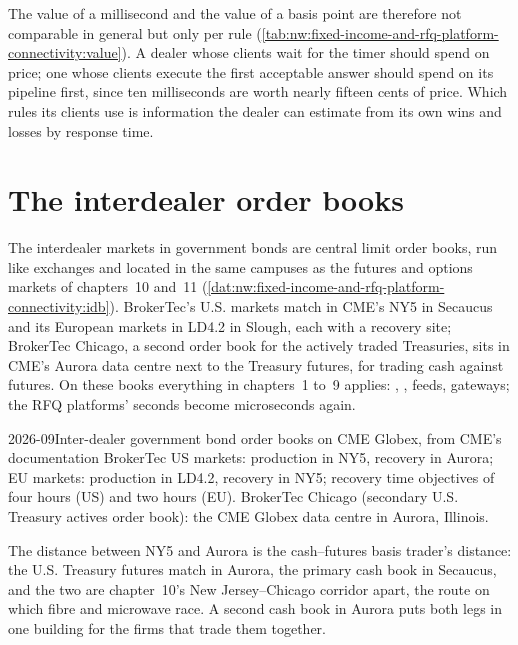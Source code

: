 The value of a millisecond and the value of a basis point are therefore not comparable in general but only per rule
(\cref{tab:nw:fixed-income-and-rfq-platform-connectivity:value}). A dealer whose clients wait for the timer should spend on price; one
whose clients execute the first acceptable answer should spend on its pipeline first, since ten milliseconds are worth nearly fifteen cents of
price. Which rules its clients use is information the dealer can estimate from its own wins and losses by response time.

\section{The interdealer order books}

The interdealer markets in government bonds are central limit order books, run like exchanges and located in the same campuses as
the futures and options markets of chapters~10 and~11 (\cref{dat:nw:fixed-income-and-rfq-platform-connectivity:idb}). BrokerTec's
U.S. markets match in CME's NY5 in Secaucus and its European markets in LD4.2 in Slough, each with a recovery site; BrokerTec Chicago, a
second order book for the actively traded Treasuries, sits in CME's Aurora data centre next to the Treasury futures, for trading cash
against futures. On these books everything in chapters~1 to~9 applies: , , feeds, gateways; the RFQ platforms'
seconds become microseconds again.

\begin{dated}{2026-09}{Inter-dealer government bond order books on CME Globex, from CME's documentation}\label{dat:nw:fixed-income-and-rfq-platform-connectivity:idb}
BrokerTec US markets: production in NY5, recovery in Aurora; EU markets: production in LD4.2, recovery in NY5; recovery time objectives
of four hours (US) and two hours (EU). BrokerTec Chicago (secondary U.S. Treasury actives order book): the CME Globex data centre in
Aurora, Illinois.
\end{dated}

The distance between NY5 and Aurora is the cash--futures basis trader's distance: the U.S. Treasury futures match in Aurora, the
primary cash book in Secaucus, and the two are chapter~10's New Jersey--Chicago corridor apart, the route on which fibre and microwave
race. A second cash book in Aurora puts both legs in one building for the firms that trade them together.

